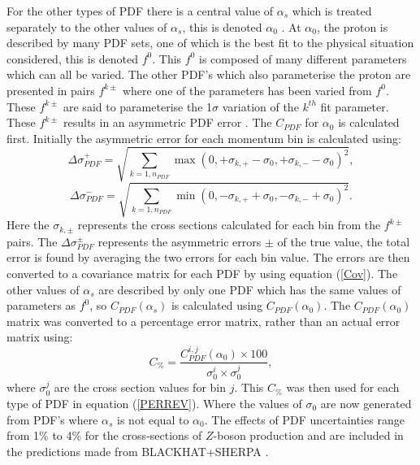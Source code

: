 \documentclass[12pt, onecolumn]{revtex4}    %
\begin{document}
For the other types of PDF there is a central value of ${\alpha_s}$ which is treated separately to the other values of ${\alpha_s}$, this is denoted ${\alpha_0}$ . At ${\alpha_0}$, the proton is described by many PDF sets, one of which is the best fit to the physical situation considered, this is denoted ${f^0}$. This  ${f^0}$ is composed of many different parameters which can all be varied. The other PDF's which also parameterise the proton are presented in pairs ${f^{k \pm}}$ where one of the parameters has been varied from ${f^0}$. These ${f^{k \pm}}$ are said to parameterise the 1${\sigma}$ variation of the ${k^{th}}$ fit parameter. These ${f^{k \pm}}$ results in an asymmetric PDF error \cite{CPDF}. The ${C_{PDF}}$ for  ${\alpha_0}$ is calculated first. Initially the asymmetric error for each momentum bin is calculated using: \begin{equation} \Delta\sigma^+_{PDF} = \sqrt{\sum_{k=1,n_{PDF}} {\max(0, +\sigma_{k,+} - \sigma_0, +\sigma_{k,-} -\sigma_0)^2}}, \end{equation}  \begin{equation} \Delta\sigma^-_{PDF} = \sqrt{\sum_{k=1,n_{PDF}} {\min(0, -\sigma_{k,+} + \sigma_0, -\sigma_{k,-} +\sigma_0)^2}}. \end{equation} Here the ${\sigma_{k,\pm}}$ represents the cross sections calculated for each bin from the ${f^{k \pm}}$ pairs. The  ${\Delta\sigma^\pm_{PDF}}$ represents the asymmetric errors ${\pm}$ of the true value, the total error is found by averaging the two errors for each bin value. The errors are then converted to a covariance matrix for each PDF by using equation (\ref{Cov}). The other values of ${\alpha_s}$ are described by only one PDF which has the same values of parameters as ${f^0}$, so ${C_{PDF}(\alpha_s)}$ is calculated using ${C_{PDF}(\alpha_0)}$. The ${C_{PDF}(\alpha_0)}$ matrix was converted to a percentage error matrix, rather than an actual error matrix using: \begin{equation} \label{PERREV} C_{\%} = \dfrac{C_{PDF}^{i,j}(\alpha_0) \times 100}{ \sigma_{0}^{i} \times  \sigma_{0}^{j}}, \end{equation} where ${\sigma_0^j}$ are the cross section values for bin ${j}$. This ${C_{\%}}$ was then used for each type of PDF in equation (\ref{PERREV}). Where the values of ${\sigma_{0}}$ are now generated from PDF's where ${\alpha_s}$ is not equal to ${\alpha_0}$. The effects of PDF uncertainties range from 1\% to 4\% for the cross-sections of ${Z}$-boson production and are included in the predictions made from BLACKHAT+SHERPA \cite{HEPP}.
 
\end{document}
